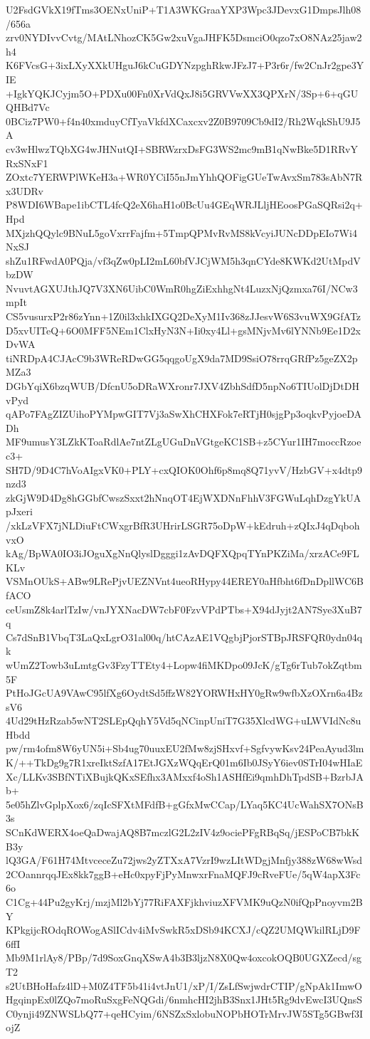 U2FsdGVkX19fTms3OENxUniP+T1A3WKGraaYXP3Wpc3JDevxG1DmpsJlh08/656a
zrv0NYDIvvCvtg/MAtLNhozCK5Gw2xuVgaJHFK5DsmciO0qzo7xO8NAz25jaw2h4
K6FVcsG+3ixLXyXXkUHguJ6kCuGDYNzpghRkwJFzJ7+P3r6r/fw2CnJr2gpe3YIE
+IgkYQKJCyjm5O+PDXu00Fn0XrVdQxJ8i5GRVVwXX3QPXrN/3Sp+6+qGUQHBd7Vc
0BCiz7PW0+f4n40xmduyCfTyaVkfdXCaxcxv2Z0B9709Cb9dI2/Rh2WqkShU9J5A
cv3wHlwzTQbXG4wJHNutQI+SBRWzrxDsFG3WS2mc9mB1qNwBke5D1RRvYRxSNxF1
ZOxtc7YERWPlWKeH3a+WR0YCiI55nJmYhhQOFigGUeTwAvxSm783sAbN7Rx3UDRv
P8WDI6WBape1ibCTL4fcQ2eX6haH1o0BcUu4GEqWRJLljHEoosPGaSQRsi2q+Hpd
MXjzhQQylc9BNuL5goVxrrFajfm+5TmpQPMvRvMS8kVcyiJUNcDDpEIo7Wi4NxSJ
shZu1RFwdA0PQja/vf3qZw0pLI2mL60bfVJCjWM5h3qnCYde8KWKd2UtMpdVbzDW
NvuvtAGXUJthJQ7V3XN6UibC0WmR0hgZiExhhgNt4LuzxNjQzmxa76I/NCw3mpIt
CS5vusurxP2r86zYnn+1Z0il3xhkIXGQ2DeXyM1Iv368zJJesvW6S3vuWX9GfATz
D5xvUITeQ+6O0MFF5NEm1ClxHyN3N+Ii0xy4Ll+gsMNjvMv6lYNNb9Ee1D2xDvWA
tiNRDpA4CJAcC9b3WReRDwGG5qqgoUgX9da7MD9SsiO78rrqGRfPz5geZX2pMZa3
DGbYqiX6bzqWUB/DfcnU5oDRaWXronr7JXV4ZbhSdfD5npNo6TIUolDjDtDHvPyd
qAPo7FAgZIZUihoPYMpwGIT7Vj3aSwXhCHXFok7eRTjH0sjgPp3oqkvPyjoeDADh
MF9umusY3LZkKToaRdlAe7ntZLgUGuDnVGtgeKC1SB+z5CYur1IH7moccRzoec3+
SH7D/9D4C7hVoAIgxVK0+PLY+cxQIOK0Ohf6p8mq8Q71yvV/HzbGV+x4dtp9nzd3
zkGjW9D4Dg8hGGbfCwszSxxt2hNnqOT4EjWXDNnFhhV3FGWuLqhDzgYkUApJxeri
/xkLzVFX7jNLDiuFtCWxgrBfR3UHrirLSGR75oDpW+kEdruh+zQIxJ4qDqbohvxO
kAg/BpWA0IO3iJOguXgNnQlyslDgggi1zAvDQFXQpqTYnPKZiMa/xrzACe9FLKLv
VSMnOUkS+ABw9LRePjvUEZNVnt4ueoRHypy44EREY0aHfbht6fDnDpllWC6BfACO
ceUsmZ8k4arlTzIw/vnJYXNacDW7cbF0FzvVPdPTbs+X94dJyjt2AN7Sye3XuB7q
Cs7dSnB1VbqT3LaQxLgrO31al00q/htCAzAE1VQgbjPjorSTBpJRSFQR0ydn04qk
wUmZ2Towb3uLmtgGv3FzyTTEty4+Lopw4fiMKDpo09JcK/gTg6rTub7okZqtbm5F
PtHoJGcUA9VAwC95lfXg6OydtSd5ffzW82YORWHxHY0gRw9wfbXzOXrn6a4BzsV6
4Ud29tHzRzab5wNT2SLEpQqhY5Vd5qNCinpUniT7G35XlcdWG+uLWVIdNc8uHbdd
pw/rm4ofm8W6yUN5i+Sb4ug70uuxEU2fMw8zjSHxvf+SgfvywKsv24PeaAyud3lm
K/++TkDg9g7R1xreIktSzfA17EtJGXzWQqErQ01m6Ib0JSyY6iev0STrI04wHIaE
Xc/LLKv3SBfNTiXBujkQKxSEfhx3AMxxf4oSh1ASHfEi9qmhDhTpdSB+BzrbJAb+
5e05hZlvGplpXox6/zqIcSFXtMFdfB+gGfxMwCCap/LYaq5KC4UcWahSX7ONsB3s
SCnKdWERX4oeQaDwajAQ8B7mczlG2L2zIV4z9ociePFgRBqSq/jESPoCB7bkKB3y
lQ3GA/F61H74MtvceceZu72jws2yZTXxA7VzrI9wzLItWDgjMnfjy388zW68wWsd
2COannrqqJEx8kk7ggB+eHc0xpyFjPyMnwxrFnaMQFJ9cRveFUe/5qW4apX3Fc6o
C1Cg+44Pu2gyKrj/mzjMl2bYj77RiFAXFjkhviuzXFVMK9uQzN0ifQpPnoyvm2BY
KPkgijcROdqROWogASlICdv4iMvSwkR5xDSb94KCXJ/cQZ2UMQWkilRLjD9F6ffI
Mb9M1rlAy8/PBp/7d9SoxGnqXSwA4b3B3ljzN8X0Qw4oxcokOQB0UGXZecd/sgT2
s2UtBHoHafz4lD+M0Z4TF5b41i4vtJnU1/xP/I/ZsLfSwjwdrCTIP/gNpAk1ImwO
HgqinpEx0lZQo7moRuSxgFeNQGdi/6nmhcHI2jhB3Snx1JHt5Rg9dvEwcI3UQnsS
C0ynji49ZNWSLbQ77+qeHCyim/6NSZxSxlobuNOPbHOTrMrvJW5STg5GBwf3IojZ
